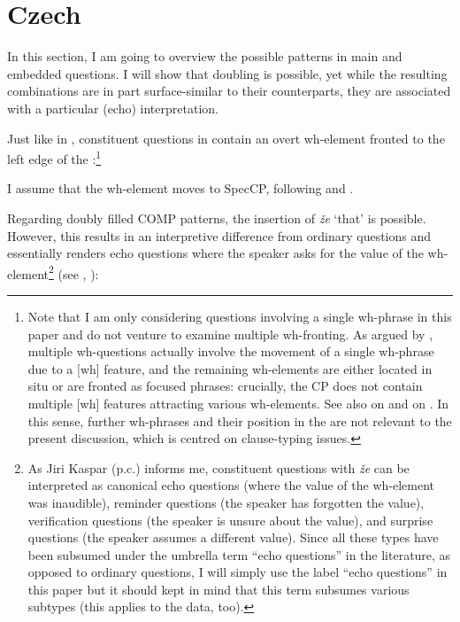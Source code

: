 \documentclass[output=paper,modfonts, hidelinks, newtxmath]{langscibook}
\begin{document}
\section{Czech}
In this section, I am going to overview the possible patterns in  main and embedded questions. I will show that doubling is possible, yet while the resulting combinations are in part surface-similar to their  counterparts, they are associated with a particular (echo) interpretation.

Just like in , constituent questions in  contain an overt wh-element fronted to the left edge of the :\footnote{Note that I am only considering questions involving a single wh-phrase in this paper and do not venture to examine multiple wh-fronting. As argued by \citet{Boskovic2012}, multiple wh-questions actually involve the movement of a single wh-phrase due to a [wh] feature, and the remaining wh-elements are either located in situ or are fronted as focused phrases: crucially, the CP does not contain multiple [wh] features attracting various wh-elements. See also \citet{gruetskrabalova2011} on  and \citet{mismas2016} on . In this sense, further wh-phrases and their position in the  are not relevant to the present discussion, which is centred on clause-typing issues.}

\ea
	\z
\z

\noindent I assume that the wh-element moves to SpecCP, following \citet{rudin1988} and \citet{kaspar2015}.

Regarding doubly filled COMP patterns, the insertion of \textit{že} `that' is possible. However, this results in an interpretive difference from ordinary questions and essentially renders echo questions where the speaker asks for the value of the wh-element\footnote{As Jiri Kaspar (p.c.) informs me, constituent questions with \textit{že} can be interpreted as canonical echo questions (where the value of the wh-element was inaudible), reminder questions (the speaker has forgotten the value), verification questions (the speaker is unsure about the value), and surprise questions (the speaker assumes a different value). Since all these types have been subsumed under the umbrella term ``echo questions'' in the literature, as opposed to ordinary questions, I will simply use the label ``echo questions'' in this paper but it should kept in mind that this term subsumes various subtypes (this applies to the  data, too).} (see \citealt{kaspar2015}, \citealt{gruetskrabalova2011}):
\end{document}
